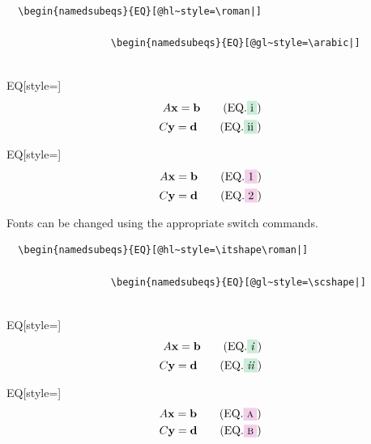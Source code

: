 \documentclass{article}
\newcommand{\hl}[1]{\colorbox{SeaGreen!30}{#1}}
\newcommand{\gl}[1]{\colorbox{Thistle!30}{#1}}
\begin{document}
\begin{tcolorbox}
  \begin{Verbatim}
  \begin{namedsubeqs}{EQ}[@hl~style=\roman|]
  
                  \begin{namedsubeqs}{EQ}[@gl~style=\arabic|]
                  
  \end{Verbatim}
\tcblower
  \begin{minipage}[T]{0.4\textwidth}
  	\begin{namedsubeqs}{EQ}[style=\roman]
    \begin{align}
      A\mathbf{x} = \mathbf{b}   \tag{EQ.\hl{i}}\\
      C\mathbf{y} = \mathbf{d}   \tag{EQ.\hl{ii}}
    \end{align}
    \end{namedsubeqs}
  \end{minipage}
  \HSKP
  \begin{minipage}[T]{0.4\textwidth}
	  \begin{namedsubeqs}{EQ}[style=\arabic]
	  \begin{align}
			A\mathbf{x} = \mathbf{b}   \tag{EQ.\gl{1}}\\
			C\mathbf{y} = \mathbf{d}   \tag{EQ.\gl{2}}
	  \end{align}
	  \end{namedsubeqs}
  \end{minipage}
\end{tcolorbox}


Fonts can be changed using the appropriate switch commands.
\begin{tcolorbox}
  \begin{Verbatim}
  \begin{namedsubeqs}{EQ}[@hl~style=\itshape\roman|]
  
                  \begin{namedsubeqs}{EQ}[@gl~style=\scshape|]
                  
  \end{Verbatim}
\tcblower
  \begin{minipage}[T]{0.4\textwidth}
  	\begin{namedsubeqs}{EQ}[style=\roman]
    \begin{align}
      A\mathbf{x} = \mathbf{b}   \tag{EQ.\hl{\itshape i}}\\
      C\mathbf{y} = \mathbf{d}   \tag{EQ.\hl{\itshape ii}}
    \end{align}
    \end{namedsubeqs}
  \end{minipage}
  \HSKP
  \begin{minipage}[T]{0.4\textwidth}
	  \begin{namedsubeqs}{EQ}[style=\arabic]
	  \begin{align}
			A\mathbf{x} = \mathbf{b}   \tag{EQ.\gl{\scshape a}}\\
			C\mathbf{y} = \mathbf{d}   \tag{EQ.\gl{\scshape b}}
	  \end{align}
	  \end{namedsubeqs}
  \end{minipage}
\end{tcolorbox}
\end{document}
